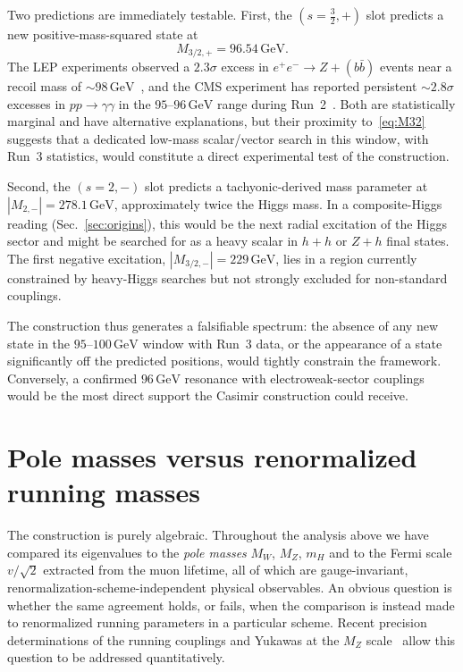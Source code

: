 \documentclass[twocolumn,aps,prd,floatfix,nofootinbib,superscriptaddress,10pt]{article}
\newcommand{\MW}{M_W}
\newcommand{\MZ}{M_Z}
\newcommand{\mH}{m_H}
\newcommand{\GeV}{\,\mathrm{GeV}}
\begin{document}
Two predictions are immediately testable. First, the $(s=\tfrac32,+)$ slot predicts a new positive-mass-squared state at
\begin{equation}
M_{3/2,+} = 96.54\GeV.
\label{eq:M32}
\end{equation}
The LEP experiments observed a $2.3\sigma$ excess in $e^+e^-\to Z+(b\bar b)$ events near a recoil mass of $\sim 98\GeV$~\cite{LEP98}, and the CMS experiment has reported persistent $\sim 2.8\sigma$ excesses in $pp\to\gamma\gamma$ in the $95$--$96\GeV$ range during Run~2~\cite{CMS95}. Both are statistically marginal and have alternative explanations, but their proximity to~\eqref{eq:M32} suggests that a dedicated low-mass scalar/vector search in this window, with Run~3 statistics, would constitute a direct experimental test of the construction.

Second, the $(s=2,-)$ slot predicts a tachyonic-derived mass parameter at $|M_{2,-}|=278.1\GeV$, approximately twice the Higgs mass. In a composite-Higgs reading (Sec.~\ref{sec:origins}), this would be the next radial excitation of the Higgs sector and might be searched for as a heavy scalar in $h+h$ or $Z+h$ final states. The first negative excitation, $|M_{3/2,-}|=229\GeV$, lies in a region currently constrained by heavy-Higgs searches but not strongly excluded for non-standard couplings.

The construction thus generates a falsifiable spectrum: the absence of any new state in the $95$--$100\GeV$ window with Run~3 data, or the appearance of a state significantly off the predicted positions, would tightly constrain the framework. Conversely, a confirmed $96\GeV$ resonance with electroweak-sector couplings would be the most direct support the Casimir construction could receive.

\section{Pole masses versus renormalized running masses}
\label{sec:running}

The construction is purely algebraic. Throughout the analysis above we have compared its eigenvalues to the {\em pole masses} $\MW$, $\MZ$, $\mH$ and to the Fermi scale $v/\sqrt{2}$ extracted from the muon lifetime, all of which are gauge-invariant, renormalization-scheme-independent physical observables. An obvious question is whether the same agreement holds, or fails, when the comparison is instead made to renormalized running parameters in a particular scheme. Recent precision determinations of the running couplings and Yukawas at the $\MZ$ scale~\cite{AntuschHinzeSaad2026} allow this question to be addressed quantitatively.
\end{document}
